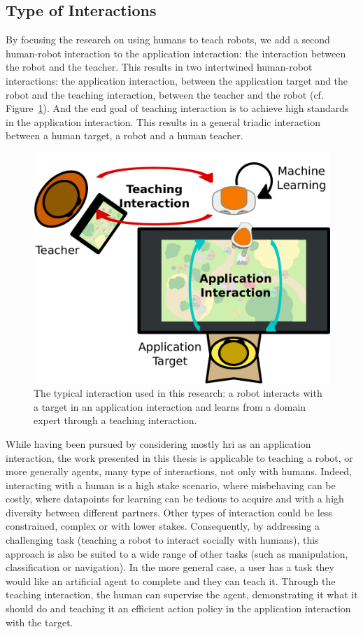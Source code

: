 \subsection{Type of Interactions}

By focusing the research on using humans to teach robots, we add a second human-robot interaction to the application interaction: the interaction between the robot and the teacher. This results in two intertwined human-robot interactions: the application interaction, between the application target and the robot and the teaching interaction, between the teacher and the robot (cf. Figure~\ref{fig:intro_setup}). And the end goal of teaching interaction is to achieve high standards in the application interaction. This results in a general triadic interaction between a human target, a robot and a human teacher. 

\begin{figure}[ht]
	\includegraphics[width=.7\linewidth]{setup.pdf}
	\centering
	\caption{The typical interaction used in this research: a robot interacts with a target in an application interaction and learns from a domain expert through a teaching interaction.}
	\label{fig:intro_setup}
\end{figure}

While having been pursued by considering mostly \gls{hri} as an application interaction, the work presented in this thesis is applicable to teaching a robot, or more generally agents, many type of interactions, not only with humans. Indeed, interacting with a human is a high stake scenario, where misbehaving can be costly, where datapoints for learning can be tedious to acquire and with a high diversity between different partners. Other types of interaction could be less constrained, complex or with lower stakes. Consequently, by addressing a challenging task (teaching a robot to interact socially with humans), this approach is also be suited to a wide range of other tasks (such as manipulation, classification or navigation). In the more general case, a user has a task they would like an artificial agent to complete and they can teach it. Through the teaching interaction, the human can supervise the agent, demonstrating it what it should do and teaching it an efficient action policy in the application interaction with the target. 

